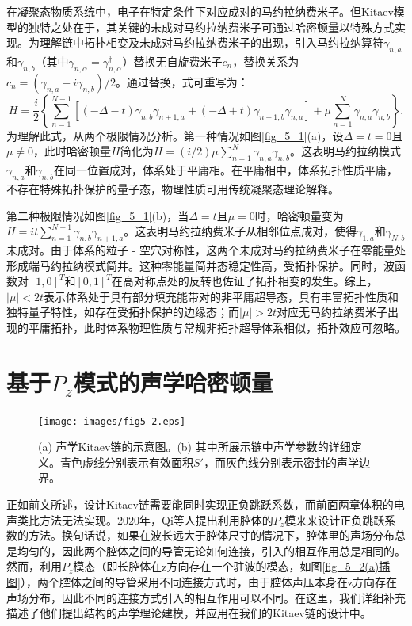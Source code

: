在凝聚态物质系统中，电子在特定条件下对应成对的马约拉纳费米子。但Kitaev模型的独特之处在于，其关键的未成对马约拉纳费米子可通过哈密顿量以特殊方式实现。为理解链中拓扑相变及未成对马约拉纳费米子的出现，引入马约拉纳算符$\gamma_{n,a}$和$\gamma_{n,b}$（其中$\gamma_{n,\alpha} = \gamma_{n,\alpha}^{\dagger}$）替换无自旋费米子$c_{n}$，替换关系为$c_{n} = (\gamma_{n,a} - i\gamma_{n,b}) / 2$。通过替换，式可重写为：
\begin{equation}\label{eq5-4}
    H = \frac{i}{2} \left\{ \sum_{n = 1}^{N - 1} [(-\Delta - t) \gamma_{n,b} \gamma_{n + 1,a} + (-\Delta + t) \gamma_{n + 1,b} \gamma_{n,a}] + \mu \sum_{n = 1}^{N} \gamma_{n,a} \gamma_{n,b} \right\}.
\end{equation}
为理解此式，从两个极限情况分析。第一种情况如图\ref{fig_5_1}(a)，设$\Delta = t = 0$且$\mu \neq 0$，此时哈密顿量$H$简化为$H = (i / 2) \mu \sum_{n = 1}^{N} \gamma_{n,a} \gamma_{n,b}$。这表明马约拉纳模式$\gamma_{n,a}$和$\gamma_{n,b}$在同一位置成对，体系处于平庸相。在平庸相中，体系拓扑性质平庸，不存在特殊拓扑保护的量子态，物理性质可用传统凝聚态理论解释。

第二种极限情况如图\ref{fig_5_1}(b)，当$\Delta = t$且$\mu = 0$时，哈密顿量变为$H = it \sum_{n = 1}^{N - 1} \gamma_{n,b} \gamma_{n + 1,a}$。这表明马约拉纳费米子从相邻位点成对，使得$\gamma_{1,a}$和$\gamma_{N,b}$未成对。由于体系的粒子 - 空穴对称性，这两个未成对马约拉纳费米子在零能量处形成端马约拉纳模式简并。这种零能量简并态稳定性高，受拓扑保护。同时，波函数对$[1, 0]^T$和$[0, 1]^T$在高对称点处的反转也佐证了拓扑相变的发生。综上，$\vert \mu \vert < 2t$表示体系处于具有部分填充能带对的非平庸超导态，具有丰富拓扑性质和独特量子特性，如存在受拓扑保护的边缘态；而$\vert \mu \vert > 2t$对应无马约拉纳费米子出现的平庸拓扑，此时体系物理性质与常规非拓扑超导体系相似，拓扑效应可忽略。 

\section{基于$P_z$模式的声学哈密顿量}

\begin{figure}[h!]
    \centering
    \texttt{[image: images/fig5-2.eps]} 
    \caption{(a) 声学Kitaev链的示意图。(b) 其中所展示链中声学参数的详细定义。青色虚线分别表示有效面积$S'$，而灰色线分别表示密封的声学边界。}
    \label{fig_5_2}
\end{figure}

正如前文所述，设计Kitaev链需要能同时实现正负跳跃系数，而前面两章体积的电声类比方法无法实现。2020年，Qi等人提出利用腔体的$P_z$模来来设计正负跳跃系数的方法\cite{j10}。换句话说，如果在波长远大于腔体尺寸的情况下，腔体里的声场分布总是均匀的，因此两个腔体之间的导管无论如何连接，引入的相互作用总是相同的。然而，利用$P_z$模态（即长腔体在z方向存在一个驻波的模态，如图\ref{fig_5_2(a)插图}），两个腔体之间的导管采用不同连接方式时，由于腔体声压本身在z方向存在声场分布，因此不同的连接方式引入的相互作用可以不同。在这里，我们详细补充描述了他们提出结构的声学理论建模，并应用在我们的Kitaev链的设计中。

